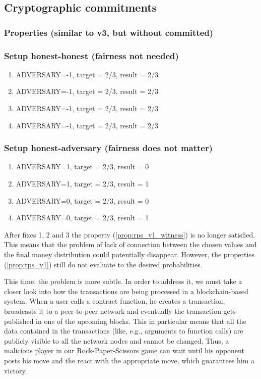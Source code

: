 \documentclass{article}
\begin{document}
\subsection{Cryptographic commitments}

\subsubsection{Properties (similar to v3, but without committed)}



\subsubsection{Setup honest-honest (fairness not needed)}

\begin{enumerate}
\item ADVERSARY=-1, target = 2/3, result = 2/3
\item ADVERSARY=-1, target = 2/3, result = 2/3
\item ADVERSARY=-1, target = 2/3, result = 2/3
\item ADVERSARY=-1, target = 2/3, result = 2/3
\end{enumerate}

\subsubsection{Setup honest-adversary (fairness does not matter)}

\begin{enumerate}
\item ADVERSARY=1, target = 2/3, result = 0
\item ADVERSARY=1, target = 2/3, result = 1
\item ADVERSARY=0, target = 2/3, result = 0
\item ADVERSARY=0, target = 2/3, result = 1
\end{enumerate}

After fixes 1, 2 and 3 the property (\ref{prop:rps_v1_witness}) is no longer satisfied.
This means that the problem of lack of connection between the chosen values and the final money distribution
could potentially disappear.
However, the properties (\ref{prop:rps_v1}) still do not evaluate to the desired probabilities.

This time, the problem is more subtle.
In order to address it, we must take a closer look into how the transactions are being processed
in a blockchain-based system.
When a user calls a contract function, he creates a transaction, broadcasts it to a peer-to-peer network and 
eventually the transaction gets published in one of the upcoming blocks.
This in particular means that all the data contained in the transactions (like, e.g., arguments to function calls)
are publicly visible to all the network nodes and cannot be changed.
Thus, a malicious player in our Rock-Paper-Scissors game can wait until his opponent posts his move and 
the react with the appropriate move, which guarantees him a victory.
\end{document}
